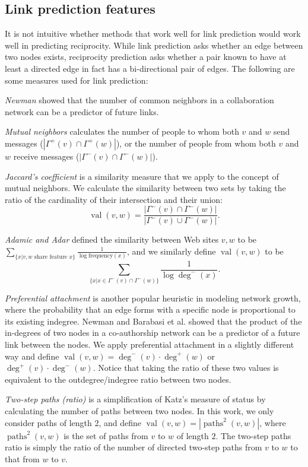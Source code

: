 \documentclass[conference]{IEEEtran}
\begin{document}
\subsection{Link prediction features}

It is not intuitive whether methods that work well for link prediction would work well in predicting reciprocity. 
While link prediction asks whether an edge between two nodes exists,
reciprocity prediction asks whether a pair known to have at least
a directed edge in fact has a bi-directional pair of edges.
The following are some measures used for link prediction:

\emph{Newman} \cite{graph:common-neighbors} showed that the number of common neighbors in a collaboration network can be a predictor of future links. 

\emph{Mutual neighbors} calculates the number of people to whom both $v$ and $w$ send messages ($|\Gamma^+(v) \cap \Gamma^+(w)|$), or the number of people from whom both $v$ and $w$ receive messages ($|\Gamma^-(v) \cap \Gamma^-(w)|$).

\emph{Jaccard's coefficient} \cite{Salton:86} is a similarity measure
that we apply to the concept of mutual neighbors. We calculate the
similarity between two sets by taking the ratio of the cardinality of
their intersection and their union: \[\operatorname{val}(v,w) =
\frac{|\Gamma^-(v) \cap \Gamma^-(w)|}{|\Gamma^-(v) \cup
\Gamma^-(w)|}.\]

\emph{Adamic and Adar} \cite{Adamic:2003ud} defined the similarity between Web sites $v,w$ to be $ \sum_{\{x|v,w \text{ share feature }x\}} \frac{1}{\log{\text{frequency}(x)}} $, and we similarly define $\operatorname{val}(v,w)$ to be \[ \sum_{\{x|x \in \Gamma^-(v) \cap \Gamma^-(w)\}} \frac{1}{\log{\deg^-(x)}} .\]

\emph{Preferential attachment} is another popular heuristic in modeling network growth, where the probability that an edge forms with a specific node is proportional to its existing indegree. Newman \cite{graph:common-neighbors} and Barabasi et al. \cite{Barabasi:2002} showed that the product of the in-degrees of two nodes in a co-authorship network can be a predictor of a future link between the nodes. We apply preferential attachment in a slightly different way and define  $\operatorname{val}(v,w) = \deg^-(v)\cdot \deg^+(w)$ or $\deg^+(v)\cdot \deg^-(w)$. 
Notice that taking the ratio of these two values is equivalent to the outdegree/indegree ratio between two nodes.

\emph{Two-step paths (ratio)} is a simplification of Katz's \cite{Katz:1953un} measure of status by calculating the number of paths between two nodes. 
In this work, we only consider paths of length 2, and define $\operatorname{val}(v,w) = |\operatorname{paths}^2(v,w)|$, where $\operatorname{paths}^2(v,w)$ is the set of paths from $v$ to $w$ of length $2$. 
The two-step paths ratio is simply the ratio of the 
number of directed two-step paths from $v$ to $w$ to that from $w$ to $v$. 
\end{document}
